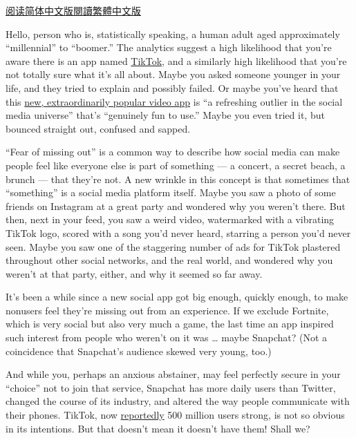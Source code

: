 \href{https://cn.nytimes.com/technology/20190312/what-is-tik-tok/}{阅读简体中文版}\href{https://cn.nytimes.com/technology/20190312/what-is-tik-tok/zh-hant/}{閱讀繁體中文版}

Hello, person who is, statistically speaking, a human adult aged
approximately ``millennial'' to ``boomer.'' The analytics suggest a high
likelihood that you're aware there is an app named
\href{https://www.nytimes.com/2020/07/26/technology/tiktok-china-ban-model.html}{TikTok},
and a similarly high likelihood that you're not totally sure what it's
all about. Maybe you asked someone younger in your life, and they tried
to explain and possibly failed. Or maybe you've heard that this
\href{https://www.nytimes.com/2018/12/03/technology/tiktok-a-chinese-video-app-brings-fun-back-to-social-media.html}{new,
extraordinarily popular video app} is ``a refreshing outlier in the
social media universe'' that's ``genuinely fun to use.'' Maybe you even
tried it, but bounced straight out, confused and sapped.

``Fear of missing out'' is a common way to describe how social media can
make people feel like everyone else is part of something --- a concert,
a secret beach, a brunch --- that they're not. A new wrinkle in this
concept is that sometimes that ``something'' is a social media platform
itself. Maybe you saw a photo of some friends on Instagram at a great
party and wondered why you weren't there. But then, next in your feed,
you saw a weird video, watermarked with a vibrating TikTok logo, scored
with a song you'd never heard, starring a person you'd never seen. Maybe
you saw one of the staggering number of ads for TikTok plastered
throughout other social networks, and the real world, and wondered why
you weren't at that party, either, and why it seemed so far away.

It's been a while since a new social app got big enough, quickly enough,
to make nonusers feel they're missing out from an experience. If we
exclude Fortnite, which is very social but also very much a game, the
last time an app inspired such interest from people who weren't on it
was \ldots{} maybe Snapchat? (Not a coincidence that Snapchat's audience
skewed very young, too.)

And while you, perhaps an anxious abstainer, may feel perfectly secure
in your ``choice'' not to join that service, Snapchat has more daily
users than Twitter, changed the course of its industry, and altered the
way people communicate with their phones. TikTok, now
\href{https://www.scmp.com/tech/article/2155580/tik-tok-hits-500-million-global-monthly-active-users-china-social-media-video}{reportedly}
500 million users strong, is not so obvious in its intentions. But that
doesn't mean it doesn't have them! Shall we?

